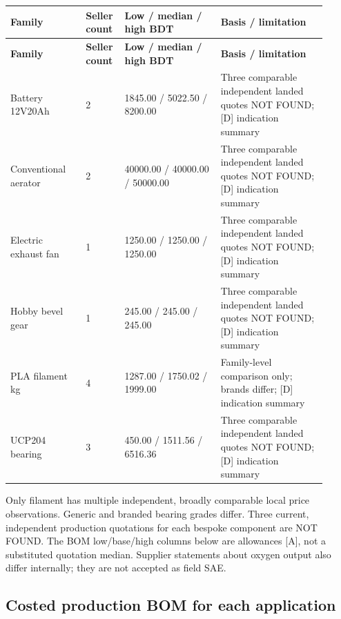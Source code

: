 \documentclass[11pt,a4paper]{article}
\begin{document}
{\small
\setlength{\tabcolsep}{3pt}\renewcommand{\arraystretch}{1.18}
\begin{longtable}{@{}>{\raggedright\arraybackslash}p{0.2209\linewidth}>{\raggedright\arraybackslash}p{0.0883\linewidth}>{\raggedright\arraybackslash}p{0.2827\linewidth}>{\raggedright\arraybackslash}p{0.3181\linewidth}@{}}
\toprule \textbf{Family} & \textbf{Seller count} & \textbf{Low / median / high BDT} & \textbf{Basis / limitation} \\ \midrule
\endfirsthead\toprule \textbf{Family} & \textbf{Seller count} & \textbf{Low / median / high BDT} & \textbf{Basis / limitation} \\ \midrule
\endhead\bottomrule\endfoot
Battery 12V20Ah & \num{2} & \num{1845.00} / \num{5022.50} / \num{8200.00} & Three comparable independent landed quotes NOT FOUND; [D] indication summary \\
Conventional aerator & \num{2} & \num{40000.00} / \num{40000.00} / \num{50000.00} & Three comparable independent landed quotes NOT FOUND; [D] indication summary \\
Electric exhaust fan & \num{1} & \num{1250.00} / \num{1250.00} / \num{1250.00} & Three comparable independent landed quotes NOT FOUND; [D] indication summary \\
Hobby bevel gear & \num{1} & \num{245.00} / \num{245.00} / \num{245.00} & Three comparable independent landed quotes NOT FOUND; [D] indication summary \\
PLA filament kg & \num{4} & \num{1287.00} / \num{1750.02} / \num{1999.00} & Family-level comparison only; brands differ; [D] indication summary \\
UCP204 bearing & \num{3} & \num{450.00} / \num{1511.56} / \num{6516.36} & Three comparable independent landed quotes NOT FOUND; [D] indication summary \\
\end{longtable}}
Only filament has multiple independent, broadly comparable local price observations. Generic and branded bearing grades differ. Three current, independent production quotations for each bespoke component are NOT FOUND. The BOM low/base/high columns below are allowances [A], not a substituted quotation median. Supplier statements about oxygen output also differ internally; they are not accepted as field SAE. \cite{banglaaer,faoaer}

\subsection{Costed production BOM for each application}
\end{document}
